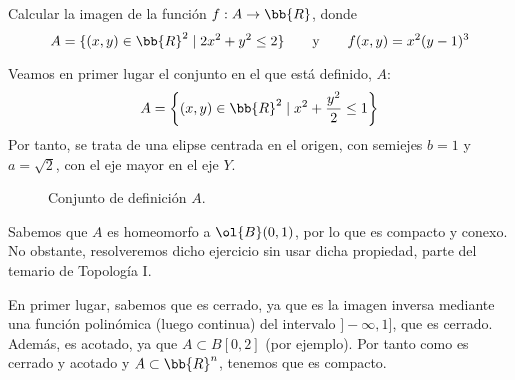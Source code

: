 \begin{ejercicio}
    Calcular la imagen de la función $f: A \to \bb{R}$, donde
    \begin{equation*}
        A = \{(x,y)\in \bb{R}^2\mid 2x^2+y^2\leq 2\}
        \qquad \text{y} \qquad
        f(x,y)=x^2(y-1)^3
    \end{equation*}

    Veamos en primer lugar el conjunto en el que está definido, $A$:
    \begin{equation*}
        A = \left\{(x,y)\in \bb{R}^2\mid x^2+\frac{y^2}{2}\leq 1\right\}
    \end{equation*}
    Por tanto, se trata de una elipse centrada en el origen,
    con semiejes $b=1$ y $a=\sqrt{2}$, con el eje mayor en el eje $Y$.
    \begin{figure}[H]
        \centering
        \caption{Conjunto de definición $A$.}
    \end{figure}

    Sabemos que $A$ es homeomorfo a $\ol{B}(0,1)$, por lo que es compacto y conexo. 
    No obstante, resolveremos dicho ejercicio sin usar dicha propiedad, parte del temario de Topología I.
    
    En primer lugar, sabemos que es cerrado, ya que es la imagen inversa mediante una función polinómica (luego continua)
    del intervalo $]-\infty,1]$, que es cerrado. Además, es acotado, ya que $A\subset B[0, 2]$ (por ejemplo). Por tanto como es cerrado y acotado y $A\subset \bb{R}^n$, tenemos que es compacto.


\end{ejercicio}
